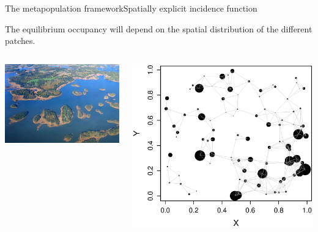 \documentclass{eecslides}
\begin{document}
	\begin{frame}{The metapopulation framework}{Spatially explicit incidence function}

	The equilibrium occupancy will depend on the spatial distribution of the different patches. 

		\begin{columns}
			\begin{column}{0.5\textwidth}
				\begin{center}
					\includegraphics[height=0.4\textheight]{archipelago}
				\end{center}
	
			\end{column}
			\begin{column}{0.5\textwidth}
				\begin{center}
					\includegraphics[height=0.5\textheight]{spatial_network}
				\end{center}
			\end{column}
		\end{columns}	 

	\end{frame}
\end{document}

